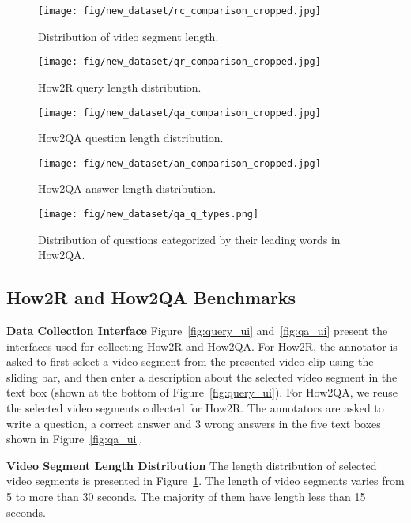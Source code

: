 \documentclass[11pt,a4paper]{article}
\begin{document}
\begin{figure}[t!]
\centering
\texttt{[image: fig/new\_dataset/rc\_comparison\_cropped.jpg]}
\caption{Distribution of video segment length.}
\label{fig:video_length}
\end{figure}

\begin{figure}[t!]
\centering
\texttt{[image: fig/new\_dataset/qr\_comparison\_cropped.jpg]}
\caption{How2R query length distribution.}
\label{fig:query_length}
\end{figure}

\begin{figure}[t!]
\centering
\texttt{[image: fig/new\_dataset/qa\_comparison\_cropped.jpg]}
\caption{How2QA question length distribution.}
\label{fig:question_length}
\end{figure}

\begin{figure}[t!]
\centering
\texttt{[image: fig/new\_dataset/an\_comparison\_cropped.jpg]}
\caption{How2QA answer length distribution.}
\label{fig:ans_length}
\end{figure}

\begin{figure}[t!]
\centering
\texttt{[image: fig/new\_dataset/qa\_q\_types.png]}
\caption{Distribution of questions categorized by their leading words in How2QA.}
\label{fig:q_type_dist}
\end{figure}

\subsection {How2R and How2QA Benchmarks}\label{app:data_analysis}
\noindent\textbf{Data Collection Interface} Figure~\ref{fig:query_ui} and~\ref{fig:qa_ui} present the interfaces used for collecting How2R and How2QA. For How2R, the annotator is asked to first select a video segment from the presented video clip using the sliding bar, and then enter a description about the selected video segment in the text box (shown at the bottom of Figure~\ref{fig:query_ui}). For How2QA, we reuse the selected video segments collected for How2R. The annotators are asked to write a question, a correct answer and 3 wrong answers in the five text boxes shown in Figure~\ref{fig:qa_ui}.


\vspace{5pt}
\noindent\textbf{Video Segment Length Distribution} The length distribution of selected video segments is presented in Figure~\ref{fig:video_length}. The length of video segments varies from 5 to more than 30 seconds. The majority of them have length less than 15 seconds.
\end{document}
